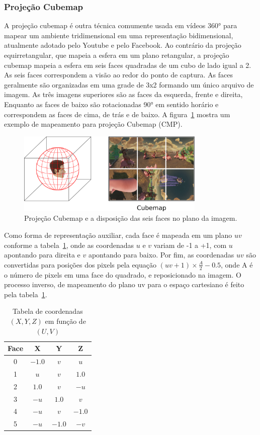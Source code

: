 {\subsubsection{Projeção Cubemap}

A projeção cubemap é outra técnica comumente usada em vídeos 360° para mapear um ambiente tridimensional em uma representação bidimensional, atualmente adotado pelo Youtube e pelo Facebook. Ao contrário da projeção equirretangular, que mapeia a esfera em um plano retangular, a projeção cubemap mapeia a esfera em seis faces quadradas de um cubo de lado igual a 2. As seis faces correspondem a visão ao redor do ponto de captura. As faces geralmente são organizadas em uma grade de 3x2 formando um único arquivo de imagem. As três imagens superiores são as faces da esquerda, frente e direita, Enquanto as faces de baixo são rotacionadas 90° em sentido horário e correspondem as faces de cima, de trás e de baixo. A figura~\ref{fig:cmp} mostra um exemplo de mapeamento para projeção Cubemap (CMP).

\begin{figure}
	\centering
	\includegraphics[width=0.8\textwidth]{fig/cmp.png}
	\caption{Projeção Cubemap e a disposição das seis faces no plano da imagem.}
	\label{fig:cmp}
\end{figure}

Como forma de representação auxiliar, cada face é mapeada em um plano $uv$ conforme a tabela~\ref{tab:uv_erp}, onde as coordenadas $u$ e $v$ variam de -1 a +1, com $u$ apontando para direita e $v$ apontando para baixo. Por fim, as coordenadas $uv$ são convertidas para posições dos pixels pela equação $ (uv+1)\times \frac{A}{2}-0.5$, onde A é o número de pixels em uma face do quadrado, e reposicionado na imagem. O processo inverso, de mapeamento do plano uv para o espaço cartesiano é feito pela tabela~\ref{tab:uv_erp}.

\begin{table}[htbp]
	\centering
	\caption{Tabela de coordenadas $(X, Y, Z)$ em função de $(U, V)$}
	\label{tab:uv_erp}
	\begin{tabular}{|c|c|c|c|}
		\hline
		\textbf{Face} & \textbf{X} & \textbf{Y} & \textbf{Z} \\
		\hline
		0 & $-1.0$ & $v$    & $u$    \\
		1 & $u$    & $v$    & $1.0$  \\
		2 & $1.0$  & $v$    & $-u$   \\
		3 & $-u$   & $1.0$  & $v$    \\
		4 & $-u$   & $v$    & $-1.0$ \\
		5 & $-u$   & $-1.0$ & $-v$   \\
		\hline
	\end{tabular}
\end{table}

}

